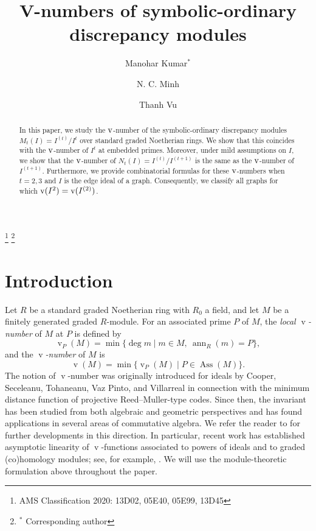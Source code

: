 \documentclass[12pt]{amsart}
\def\v{\operatorname{v}}
\def\deg{\operatorname{deg}}
\begin{document}
	
	
	\title[v-number]{V-numbers of symbolic-ordinary discrepancy modules} 
    
	\author[Manohar Kumar]{Manohar Kumar$^*$}
	\address{Department of Mathematics, Indian Institute of Technology Madras, Chennai, INDIA - 600036.}

\author[N. C. Minh]{N. C. Minh }
	\address{Faculty of Mathematics and Informatics, Hanoi University of Science and Technology, Vietnam}

    
\author{Thanh Vu}
\address{Institute of Mathematics, VAST, 18 Hoang Quoc Viet, Hanoi, Vietnam}


    
	\thanks{AMS Classification 2020: 13D02, 05E40, 05E99, 13D45}
	\thanks{$^*$ Corresponding author}
	
	
	\maketitle
	
	\begin{abstract}
		In this paper, we study the ${\rm v}$-number of the symbolic-ordinary discrepancy modules $M_t(I) = I^{(t)} / I^t$ over standard graded Noetherian rings. We show that this coincides with the ${\rm v}$-number of $I^t$ at embedded primes. Moreover, under mild assumptions on $I$, we show that the ${\rm v}$-number of $N_t(I) = I^{(t)} / I^{(t+1)}$ is the same as the ${\rm v}$-number of $I^{(t+1)}$. Furthermore, we provide combinatorial formulas for these ${\rm v}$-numbers when $t = 2, 3$ and $I$ is the edge ideal of a graph. Consequently, we classify all graphs for which ${\rm v}(I^2) = {\rm v}(I^{(2)})$.
	\end{abstract}
\section{Introduction}
Let $R$ be a standard graded Noetherian ring with $R_0$ a field, and let $M$ be a finitely generated graded $R$-module. For an associated prime $P$ of $M$, the \textit{local $\v$-number} of $M$ at $P$ is defined by
\[
\v_P(M) = \min\{\deg m \mid m \in M,\ \operatorname{ann}_R(m) = P\},
\]
and the \textit{$\v$-number} of $M$ is
\[
\v(M) = \min\{\v_P(M) \mid P \in \operatorname{Ass}(M)\}.
\]
The notion of $\v$-number was originally introduced for ideals by Cooper, Seceleanu, Tohaneanu, Vaz Pinto, and Villarreal \cite{cstvv20} in connection with the minimum distance function of projective Reed--Muller-type codes. Since then, the invariant has been studied from both algebraic and geometric perspectives and has found applications in several areas of commutative algebra. We refer the reader to \cite{chjv26,c24,fs25,fs26,kns25} for further developments in this direction. In particular, recent work has established asymptotic linearity of $\v$-functions associated to powers of ideals and to graded (co)homology modules; see, for example, \cite{fg25,gp25}. We will use the module-theoretic formulation above throughout the paper.
\end{document}
